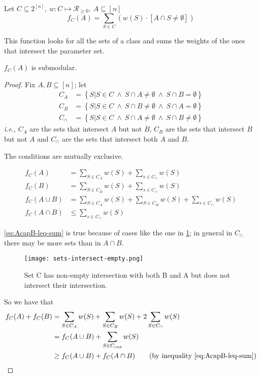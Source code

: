 \begin{defn}
    Let $ C \subseteq 2^{[n]}, \ w: C \mapsto \mathcal{R}_{\geq 0 }, \ A \subseteq [n] $
    \[
        f_C(A) = \sum_{S \in C}\left( w(S) \cdot \left[ A \cap S \neq \emptyset \right] \right)
    \]
\end{defn}
%
This function looks for all the sets of a class and sums the weights of the ones that intersect the parameter set.
%
\begin{lem} \label{fC-submodular}
    $f_C(A)$ is submodular.
\end{lem}
%
\begin{proof} 
    Fix $A,B \subseteq [n]$; let 
    \begin{align*}
        C_A &= \left\{ S | S \in C \ \land \ S \cap A \neq \emptyset \ \land \ S \cap B = \emptyset \right\} \\
        C_B &= \left\{ S | S \in C \ \land  \ S \cap B \neq \emptyset \ \land \ S \cap A = \emptyset \right\} \\
        C_{\cap} &= \left\{ S | S \in C \ \land \ S \cap A \neq \emptyset \ \land \ S \cap B \neq \emptyset \right\}
    \end{align*}
    \textit{i.e.}, $C_A$ are the sets that intersect $A$ but not $B$, $C_B$ are the sets that intersect $B$ but not $A$ and $C_{\cap}$ are the sets that intersect both $A$ and $B$.
    \begin{obs}
        The conditions are mutually exclusive.
    \end{obs}
    \begin{align}
        f_C(A) &= \sum_{S \in C_A}w(S) + \sum_{s \in C_{\cap}}w(S) \\
        f_C(B) &= \sum_{S \in C_B}w(S) + \sum_{s \in C_{\cap}}w(S) \\
        f_C(A \cup B) &= \sum_{S \in C_A}w(S) + \sum_{S \in C_B}w(S) + \sum_{s \in C_{\cap}}w(S) \\
        f_C(A \cap B) &\leq \sum_{s \in C_{\cap}}w(S) \label{eq:AcapB-leq-sum}\tag{*}
    \end{align}

    \cref{eq:AcapB-leq-sum} is true because of cases like the one in \cref{fig:sets-intersect-empty}; in general in $C_{\cap}$ there may be more sets than in $A \cap B$.

    \begin{figure}[ht]
        \centering
        \texttt{[image: sets-intersect-empty.png]}
        \caption{Set C has non-empty intersection with both B and A but does not intersect their intersection.}\label{fig:sets-intersect-empty}
    \end{figure}
    
    So we have that 
    \begin{align}
        f_C(A) + f_C(B) &= \sum_{S \in C_A}w(S) + \sum_{S \in C_B}w(S) + 2 \sum_{S \in C_{\cap}} w(S) \\
                        &= f_C(A \cup B) + \sum_{S \in C_{cap}} w(S) \\
                        &\geq f_C(A \cup B) + f_C(A \cap B) \tag{by inequality \cref{eq:AcapB-leq-sum}}
    \end{align}
\end{proof}

